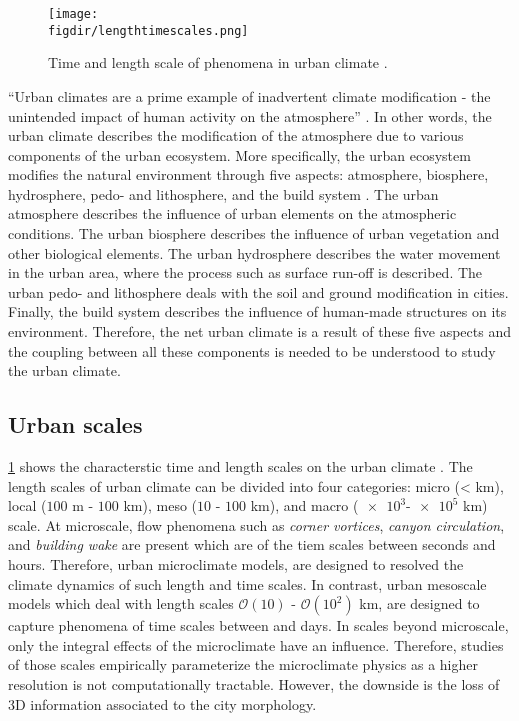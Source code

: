 \begin{figure}[p]
	\centering
	\texttt{[image: \\figdir/lengthtimescales.png]}
	\caption{Time and length scale of phenomena in urban climate \citep{Oke2017a}.}
	\label{fig:lengthtimescales}
\end{figure}


``Urban climates are a prime example of inadvertent climate modification - the unintended impact of human activity on the atmosphere'' \citep{Oke2017a}. In other words, the urban climate describes the modification of the atmosphere due to various components of the urban ecosystem. More specifically, the urban ecosystem modifies the natural environment through five aspects: atmosphere, biosphere, hydrosphere, pedo- and lithosphere, and the build system \citep{Oke2017a}. The urban atmosphere describes the influence of urban elements on the atmospheric conditions. The urban biosphere describes the influence of urban vegetation and other biological elements. The urban hydrosphere describes the water movement in the urban area, where the process such as surface run-off is described. The urban pedo- and lithosphere deals with the soil and ground modification in cities. Finally, the build system describes the influence of human-made structures on its environment. Therefore, the net urban climate is a result of these five aspects and the coupling between all these components is needed to be understood to study the urban climate.




\subsection{Urban scales}

\cref{fig:lengthtimescales} shows the characterstic time and length scales on the urban climate \citep{Oke2017a}. The length scales of urban climate can be divided into four categories: micro (< km), local ($100$ m - $100$ km), meso ($10$ - $100$ km), and macro ($\num{e3}$-$\num{e5}$ km) scale. At microscale, flow phenomena such as \textit{corner vortices}, \textit{canyon circulation}, and \textit{building wake} are present which are of the tiem scales between seconds and hours. Therefore, urban microclimate models, are designed to resolved the climate dynamics of such length and time scales. In contrast, urban mesoscale  models which deal with length scales $\mathcal{O}(10)$ - $\mathcal{O}(10^2)$ km, are designed to capture phenomena of time scales between  and days. In scales beyond microscale, only the integral effects of the microclimate have an influence. Therefore, studies of those scales empirically parameterize the microclimate physics as a higher resolution is not computationally tractable.  However, the downside is the loss of 3D information associated to the city morphology. 

